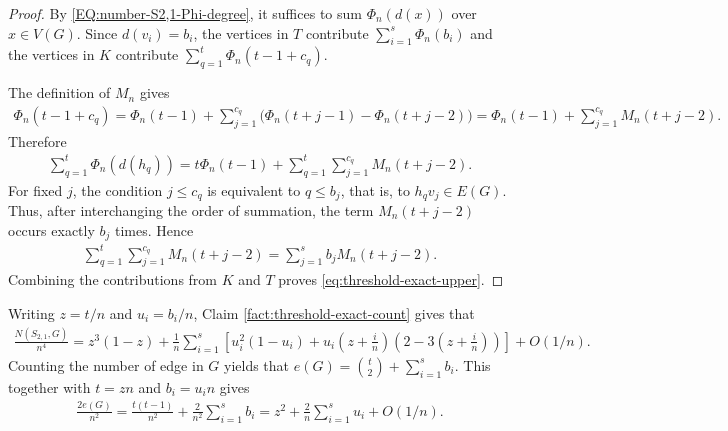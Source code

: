 \documentclass[10pt,a4paper]{article}
\begin{document}
    \begin{proof}
        By  \eqref{EQ:number-S2,1-Phi-degree}, it suffices to sum $\Phi_n(d(x))$ over
        $x\in V(G)$.  Since $d(v_i)=b_i$, the vertices in $T$ contribute
        $\sum_{i=1}^s\Phi_n(b_i)$ and the vertices in $K$ contribute
        $\sum_{q=1}^t\Phi_n(t-1+c_q)$.
        
        The definition of $M_n$ gives
        \begin{align*}
          \Phi_n(t-1+c_q)
          =\Phi_n(t-1)+\sum_{j=1}^{c_q}
            \bigl(\Phi_n(t+j-1)-\Phi_n(t+j-2)\bigr)
          =\Phi_n(t-1)+\sum_{j=1}^{c_q}M_n(t+j-2).
        \end{align*}
        Therefore
        \begin{align*}
          \sum_{q=1}^t\Phi_n(d(h_q))
          =t\Phi_n(t-1)+\sum_{q=1}^t\sum_{j=1}^{c_q}M_n(t+j-2).
        \end{align*}
        For fixed $j$, the condition $j\le c_q$ is equivalent to $q\le b_j$, that is,
        to $h_qv_j\in E(G)$.  Thus, after interchanging the order of summation, the term
        $M_n(t+j-2)$ occurs exactly $b_j$ times.  Hence
        \begin{align*}
          \sum_{q=1}^t\sum_{j=1}^{c_q}M_n(t+j-2)
          =\sum_{j=1}^s b_jM_n(t+j-2).
        \end{align*}
        Combining the contributions from $K$ and $T$ proves
        \eqref{eq:threshold-exact-upper}.
    \end{proof}

    
    Writing $z=t/n$ and $u_i=b_i/n$, Claim \ref{fact:threshold-exact-count} gives that 
    \begin{align}\label{eq:threshold-asymp-upper}
      \frac{N(S_{2,1},G)}{n^4}=z^3(1-z)+\frac1n\sum_{i=1}^s\left[u_i^2(1-u_i)+u_i\left(z+\frac{i}{n}\right)\left(2-3\left(z+\frac{i}{n}\right)\right)\right]+O(1/n).
    \end{align}
Counting the number of edge in $G$ yields that $e(G)=\binom t2+\sum_{i=1}^s b_i$. This together with  $t=zn$ and $b_i=u_in$ gives 
    \begin{align}\label{eq:threshold-edge-upper}
      \frac{2e(G)}{n^2}
      =\frac{t(t-1)}{n^2}+\frac{2}{n^2}\sum_{i=1}^s b_i
      =z^2+\frac{2}{n}\sum_{i=1}^s u_i+O(1/n).
    \end{align}
    
\end{document}
